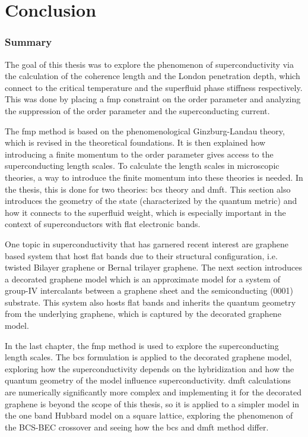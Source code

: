 \documentclass[../notes.tex]{subfiles}
\begin{document}
\raggedbottom
	
\chapter{Conclusion}\label{ch:conclusion}

\subsection*{Summary}

The goal of this thesis was to explore the phenomenon of superconductivity via the calculation of the coherence length and the London penetration depth, which connect to the critical temperature and the superfluid phase stiffness respectively.
This was done by placing a \gls{fmp} constraint on the order parameter and analyzing the suppression of the order parameter and the superconducting current.

The \gls{fmp} method is based on the phenomenological Ginzburg-Landau theory, which is revised in the theoretical foundations.
It is then explained how introducing a finite momentum to the order parameter gives access to the superconducting length scales.
To calculate the length scales in microscopic theories, a way to introduce the finite momentum into these theories is needed.
In the thesis, this is done for two theories: \gls{bcs} theory and \gls{dmft}.
This section also introduces the geometry of the state (characterized by the quantum metric) and how it connects to the superfluid weight, which is especially important in the context of superconductors with flat electronic bands.

One topic in superconductivity that has garnered recent interest are graphene based system that host flat bands due to their structural configuration, i.e. twisted Bilayer graphene or Bernal trilayer graphene.
The next section introduces a decorated graphene model which is an approximate model for a system of group-IV intercalants between a graphene sheet and the semiconducting (0001) substrate.
This system also hosts flat bands and inherits the quantum geometry from the underlying graphene, which is captured by the decorated graphene model.

In the last chapter, the \gls{fmp} method is used to explore the superconducting length scales.
The \gls{bcs} formulation is applied to the decorated graphene model, exploring how the superconductivity depends on the hybridization and how the quantum geometry of the model influence superconductivity.
\Acrshort{dmft} calculations are numerically significantly more complex and implementing it for the decorated graphene is beyond the scope of this thesis, so it is applied to a simpler model in the one band Hubbard model on a square lattice, exploring the phenomenon of the BCS-BEC crossover and seeing how the \gls{bcs} and \gls{dmft} method differ.
\end{document}
